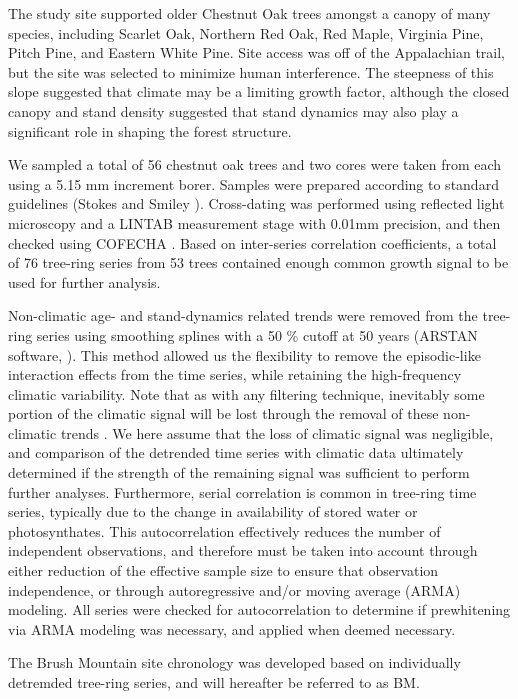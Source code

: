 \documentclass[11pt]{article}
\begin{document}
The study site supported older Chestnut Oak trees amongst a canopy of many species, including Scarlet Oak, Northern Red Oak, Red Maple, Virginia Pine, Pitch Pine, and Eastern White Pine. Site access was off of the Appalachian trail, but the site was selected to minimize human interference. The steepness of this slope suggested that climate may be a limiting growth factor, although the closed canopy and stand density suggested that stand dynamics may also play a significant role in shaping the forest structure.

We sampled a total of 56 chestnut oak trees and two cores were taken from each using a 5.15 mm increment borer. Samples were prepared according to standard guidelines (Stokes and Smiley \cite{stokes1996introduction}). Cross-dating was performed using reflected light microscopy and a LINTAB measurement stage with 0.01mm precision, and then checked using COFECHA \cite{holmes1983computer}. Based on inter-series correlation coefficients, a total of 76 tree-ring series from 53 trees contained enough common growth signal to be used for further analysis.

Non-climatic age- and stand-dynamics related trends were removed from the tree-ring series using smoothing splines with a 50 \% cutoff at 50 years (ARSTAN software, \cite{cook1997calculating}). This method allowed us the flexibility to remove the episodic-like interaction effects from the time series, while retaining the high-frequency climatic variability. Note that as with any filtering technique, inevitably some portion of the climatic signal will be lost through the removal of these non-climatic trends \cite{XXX}. We here assume that the loss of climatic signal was negligible, and comparison of the detrended time series with climatic data ultimately determined if the strength of the remaining signal was sufficient to perform further analyses. Furthermore, serial correlation is common in tree-ring time series, typically due to the change in availability of stored water or photosynthates. This autocorrelation effectively reduces the number of independent observations, and therefore must be taken into account through either reduction of the effective sample size to ensure that observation independence, or through autoregressive and/or moving average (ARMA) modeling. All series were checked for autocorrelation to determine if prewhitening via ARMA modeling was necessary, and applied when deemed necessary.  

The Brush Mountain site chronology was developed based on individually detremded tree-ring series, and will hereafter be referred to as BM. 
\end{document}
